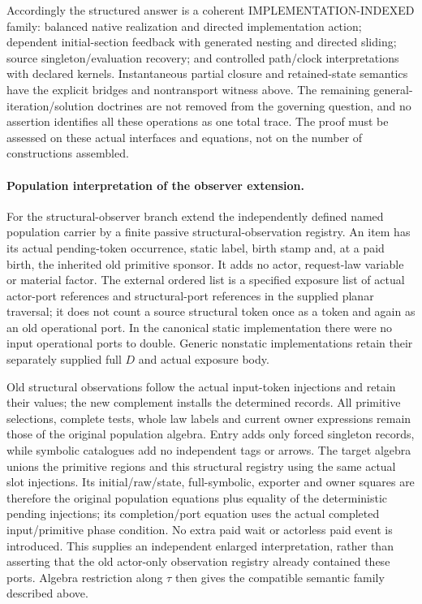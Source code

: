 \documentclass[11pt]{article}
\begin{document}
Accordingly the structured answer is a coherent IMPLEMENTATION-INDEXED family: balanced native realization and directed implementation action; dependent initial-section feedback with generated nesting and directed sliding; source singleton/evaluation recovery; and controlled path/clock interpretations with declared kernels. Instantaneous partial closure and retained-state semantics have the explicit bridges and nontransport witness above. The remaining general-iteration/solution doctrines are not removed from the governing question, and no assertion identifies all these operations as one total trace. The proof must be assessed on these actual interfaces and equations, not on the number of constructions assembled.

\paragraph{Population interpretation of the observer extension.}
For the structural-observer branch extend the independently defined named population carrier by a finite passive structural-observation registry. An item has its actual pending-token occurrence, static label, birth stamp and, at a paid birth, the inherited old primitive sponsor. It adds no actor, request-law variable or material factor. The external ordered list is a specified exposure list of actual actor-port references and structural-port references in the supplied planar traversal; it does not count a source structural token once as a token and again as an old operational port. In the canonical static implementation there were no input operational ports to double. Generic nonstatic implementations retain their separately supplied full $D$ and actual exposure body.

Old structural observations follow the actual input-token injections and retain their values; the new complement installs the determined records. All primitive selections, complete tests, whole law labels and current owner expressions remain those of the original population algebra. Entry adds only forced singleton records, while symbolic catalogues add no independent tags or arrows. The target algebra unions the primitive regions and this structural registry using the same actual slot injections. Its initial/raw/state, full-symbolic, exporter and owner squares are therefore the original population equations plus equality of the deterministic pending injections; its completion/port equation uses the actual completed input/primitive phase condition. No extra paid wait or actorless paid event is introduced. This supplies an independent enlarged interpretation, rather than asserting that the old actor-only observation registry already contained these ports. Algebra restriction along $\tau$ then gives the compatible semantic family described above.
\end{document}
